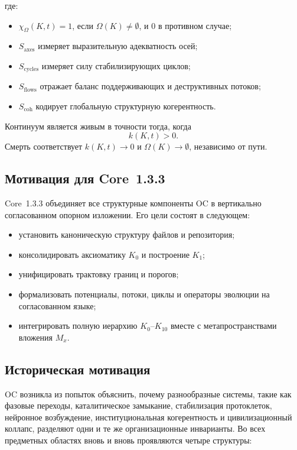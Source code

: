 где:

\begin{itemize}
    \item \(\chi_{\Omega}(K,t)=1\), если \(\Omega(K)\neq\emptyset\), и \(0\) в противном случае;
    \item \(S_{\mathrm{axes}}\) измеряет выразительную адекватность осей;
    \item \(S_{\mathrm{cycles}}\) измеряет силу стабилизирующих циклов;
    \item \(S_{\mathrm{flows}}\) отражает баланс поддерживающих и деструктивных потоков;
    \item \(S_{\mathrm{coh}}\) кодирует глобальную структурную когерентность.
\end{itemize}

Континуум является живым в точности тогда, когда
\[
k(K,t) > 0.
\]
Смерть соответствует \(k(K,t)\to 0\) и \(\Omega(K)\to\emptyset\), независимо от пути.

\subsection{Мотивация для Core~1.3.3}

Core~1.3.3 объединяет все структурные компоненты OC в вертикально согласованном опорном изложении.
Его цели состоят в следующем:

\begin{itemize}
    \item установить каноническую структуру файлов и репозитория;
    \item консолидировать аксиоматику \(K_0\) и построение \(K_1\);
    \item унифицировать трактовку границ и порогов;
    \item формализовать потенциалы, потоки, циклы и операторы эволюции на согласованном языке;
    \item интегрировать полную иерархию \(K_0\)–\(K_{10}\) вместе с метапространствами вложения \(M_x\).
\end{itemize}

\subsection{Историческая мотивация}

OC возникла из попыток объяснить, почему разнообразные системы, такие как фазовые переходы, каталитическое замыкание, стабилизация протоклеток, нейронное возбуждение, институциональная когерентность и цивилизационный коллапс, разделяют одни и те же организационные инварианты.
Во всех предметных областях вновь и вновь проявляются четыре структуры:


